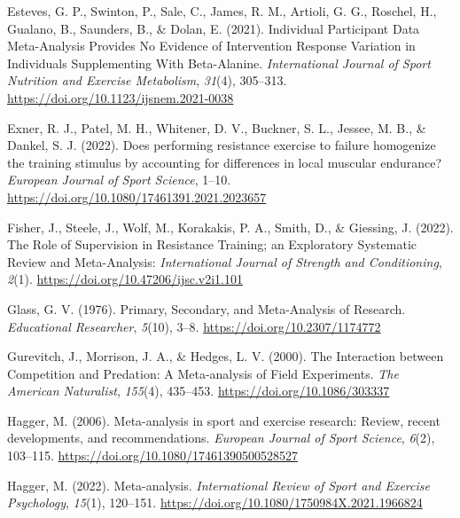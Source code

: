 \documentclass[
]{article}
\newlength{\cslhangindent}
\newlength{\cslentryspacingunit} %
\newenvironment{CSLReferences}[2] %
 {%
  \setlength{\parindent}{0pt}
  \ifodd #1
  \let\oldpar\par
  \def\par{\hangindent=\cslhangindent\oldpar}
  \fi
  \setlength{\parskip}{#2\cslentryspacingunit}
 }%
 {}
\begin{document}
\begin{CSLReferences}{1}{0}
\leavevmode{}%
Esteves, G. P., Swinton, P., Sale, C., James, R. M., Artioli, G. G., Roschel, H., Gualano, B., Saunders, B., \& Dolan, E. (2021). Individual {Participant} {Data} {Meta}-{Analysis} {Provides} {No} {Evidence} of {Intervention} {Response} {Variation} in {Individuals} {Supplementing} {With} {Beta}-{Alanine}. \emph{International Journal of Sport Nutrition and Exercise Metabolism}, \emph{31}(4), 305--313. \url{https://doi.org/10.1123/ijsnem.2021-0038}

\leavevmode{}%
Exner, R. J., Patel, M. H., Whitener, D. V., Buckner, S. L., Jessee, M. B., \& Dankel, S. J. (2022). Does performing resistance exercise to failure homogenize the training stimulus by accounting for differences in local muscular endurance? \emph{European Journal of Sport Science}, 1--10. \url{https://doi.org/10.1080/17461391.2021.2023657}

\leavevmode{}%
Fisher, J., Steele, J., Wolf, M., Korakakis, P. A., Smith, D., \& Giessing, J. (2022). The {Role} of {Supervision} in {Resistance} {Training}; an {Exploratory} {Systematic} {Review} and {Meta}-{Analysis}: \emph{International Journal of Strength and Conditioning}, \emph{2}(1). \url{https://doi.org/10.47206/ijsc.v2i1.101}

\leavevmode{}%
Glass, G. V. (1976). Primary, {Secondary}, and {Meta}-{Analysis} of {Research}. \emph{Educational Researcher}, \emph{5}(10), 3--8. \url{https://doi.org/10.2307/1174772}

\leavevmode{}%
Gurevitch, J., Morrison, J. A., \& Hedges, L. V. (2000). The {Interaction} between {Competition} and {Predation}: {A} {Meta}-analysis of {Field} {Experiments}. \emph{The American Naturalist}, \emph{155}(4), 435--453. \url{https://doi.org/10.1086/303337}

\leavevmode{}%
Hagger, M. (2006). Meta-analysis in sport and exercise research: {Review}, recent developments, and recommendations. \emph{European Journal of Sport Science}, \emph{6}(2), 103--115. \url{https://doi.org/10.1080/17461390500528527}

\leavevmode{}%
Hagger, M. (2022). Meta-analysis. \emph{International Review of Sport and Exercise Psychology}, \emph{15}(1), 120--151. \url{https://doi.org/10.1080/1750984X.2021.1966824}


\end{CSLReferences}
\end{document}
